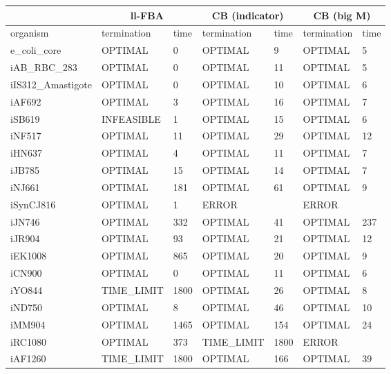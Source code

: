 \begin{table}[!ht]
    \small
    \centering
    \begin{tabular}{|l|l|l|l|l|l|l|}
    \hline
        \multicolumn{1}{|c}{} & \multicolumn{2}{|c|}{ll-FBA} & \multicolumn{2}{|c|}{CB (indicator)} & \multicolumn{2}{c|}{CB (big M)}\\ \hline 
        organism & termination & time & termination & time & termination & time \\ \hline
        e\_coli\_core & OPTIMAL & 0 & OPTIMAL & 9 & OPTIMAL & 5 \\ \hline
        iAB\_RBC\_283 & OPTIMAL & 0 & OPTIMAL & 11 & OPTIMAL & 5 \\ \hline
        iIS312\_Amastigote & OPTIMAL & 0 & OPTIMAL & 10 & OPTIMAL & 6 \\ \hline
        iAF692 & OPTIMAL & 3 & OPTIMAL & 16 & OPTIMAL & 7 \\ \hline
        iSB619 & INFEASIBLE & 1 & OPTIMAL & 15 & OPTIMAL & 6 \\ \hline
        iNF517 & OPTIMAL & 11 & OPTIMAL & 29 & OPTIMAL & 12 \\ \hline
        iHN637 & OPTIMAL & 4 & OPTIMAL & 11 & OPTIMAL & 7 \\ \hline
        iJB785 & OPTIMAL & 15 & OPTIMAL & 14 & OPTIMAL & 7 \\ \hline
        iNJ661 & OPTIMAL & 181 & OPTIMAL & 61 & OPTIMAL & 9 \\ \hline
        iSynCJ816 & OPTIMAL & 1 & ERROR & ~ & ERROR & ~ \\ \hline
        iJN746 & OPTIMAL & 332 & OPTIMAL & 41 & OPTIMAL & 237 \\ \hline
        iJR904 & OPTIMAL & 93 & OPTIMAL & 21 & OPTIMAL & 12 \\ \hline
        iEK1008 & OPTIMAL & 865 & OPTIMAL & 20 & OPTIMAL & 9 \\ \hline
        iCN900 & OPTIMAL & 0 & OPTIMAL & 11 & OPTIMAL & 6 \\ \hline
        iYO844 & TIME\_LIMIT & 1800 & OPTIMAL & 26 & OPTIMAL & 8 \\ \hline
        iND750 & OPTIMAL & 8 & OPTIMAL & 46 & OPTIMAL & 10 \\ \hline
        iMM904 & OPTIMAL & 1465 & OPTIMAL & 154 & OPTIMAL & 24 \\ \hline
        iRC1080 & OPTIMAL & 373 & TIME\_LIMIT & 1800 & ERROR & ~ \\ \hline
        iAF1260 & TIME\_LIMIT & 1800 & OPTIMAL & 166 & OPTIMAL & 39 \\ \hline

\end{tabular}
\end{table}
